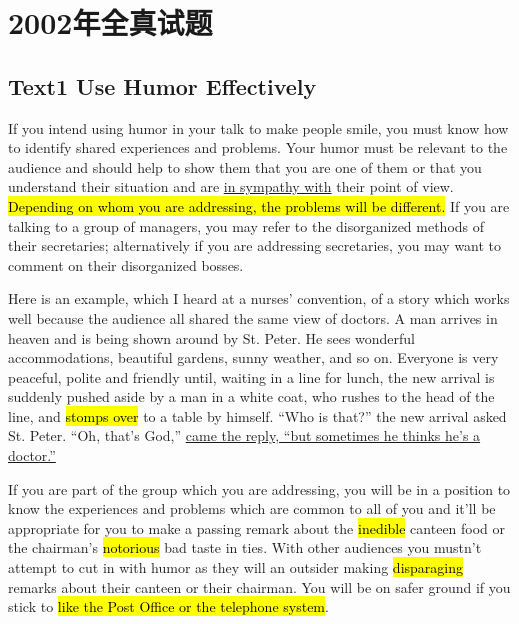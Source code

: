 \section{2002年全真试题}
\subsection{Text1 Use Humor Effectively} 
If you intend using humor in your talk to make people smile, you must know how to identify shared experiences and problems. Your humor must be relevant to the audience and should help to show them that you are one of them or that you understand their situation and are 
\underline{in sympathy with} 
their point of view. 
\hl{Depending on whom you are addressing, the problems will be different. }
If you are talking to a group of managers, you may refer to the disorganized methods of their secretaries; alternatively if you are addressing secretaries, you may want to comment on their disorganized bosses.

Here is an example, which I heard at a nurses’ convention, of a story which works well because the audience all shared the same view of doctors. A man arrives in heaven and is being shown around by St. Peter. He sees wonderful accommodations, beautiful gardens, sunny weather, and so on. Everyone is very peaceful, polite and friendly until, waiting in a line for lunch, the new arrival is suddenly pushed aside by a man in a white coat, who rushes to the head of the line, 
 and 
\hl{stomps over}
 to a table by himself. “Who is that?” the new arrival asked St. Peter. 
“Oh, that’s God,” 
\underline{came the reply, “but sometimes he thinks he’s a doctor.”}

If you are part of the group which you are addressing, you will be in a position to know the experiences and problems which are common to all of you and it’ll be appropriate for you to make a passing remark about the 
   \hl{inedible}
canteen food or the chairman’s 
 \hl{notorious}
bad taste in ties. With other audiences you mustn’t attempt to cut in with humor as they will 
an outsider making 
\hl{disparaging} 
remarks about their canteen or their chairman. You will be on safer ground if you stick to 
\hl{like the Post Office or the telephone system}.

